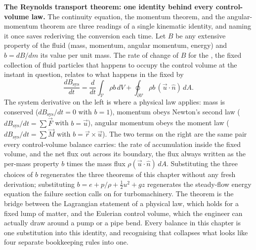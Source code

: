 \begin{mastery}
\textbf{The Reynolds transport theorem: one identity behind every
control-volume law.} The continuity equation, the momentum theorem, and
the angular-momentum theorem are three readings of a single kinematic
identity, and naming it once saves rederiving the conversion each time.
Let $B$ be any extensive property of the fluid (mass, momentum, angular
momentum, energy) and $b = dB/dm$ its value per unit mass. The rate of
change of $B$ for the , the fixed collection of fluid
particles that happens to occupy the control volume at the instant in
question, relates to what happens in the fixed 
by
\[
\frac{dB_\text{sys}}{dt}
= \frac{d}{dt}\int_{\mathcal V}\rho b\,dV
+ \oint_{\partial\mathcal V}\rho b\,(\vec u\cdot\hat n)\,dA.
\]
The system derivative on the left is where a physical law applies:
mass is conserved ($dB_\text{sys}/dt = 0$ with $b = 1$), momentum
obeys Newton's second law ($dB_\text{sys}/dt = \sum\vec F$ with
$b = \vec u$), angular momentum obeys the moment law
($dB_\text{sys}/dt = \sum\vec M$ with $b = \vec r\times\vec u$). The
two terms on the right are the same pair every control-volume balance
carries: the rate of accumulation inside the fixed volume, and the net
flux out across its boundary, the flux always written as the per-mass
property $b$ times the mass flux $\rho(\vec u\cdot\hat n)\,dA$.
Substituting the three choices of $b$ regenerates the three theorems of
this chapter without any fresh derivation; substituting $b = e +
p/\rho + \tfrac12 u^2 + gz$ regenerates the steady-flow energy equation
the failure section calls on for turbomachinery. The theorem is the
bridge between the Lagrangian statement of a physical law, which holds
for a fixed lump of matter, and the Eulerian control volume, which the
engineer can actually draw around a pump or a pipe bend. Every balance
in this chapter is one substitution into this identity, and recognising
that collapses what looks like four separate bookkeeping rules into one.
\end{mastery}



